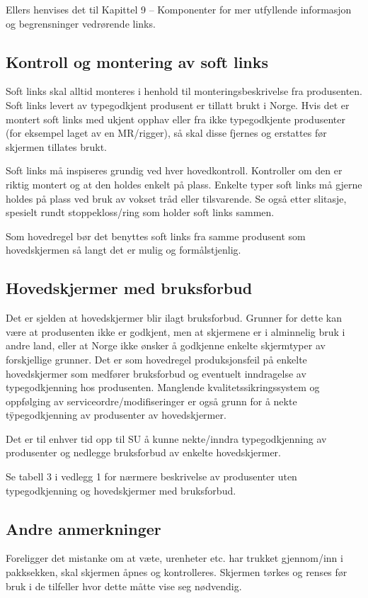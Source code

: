 Ellers henvises det til Kapittel 9 – Komponenter for mer utfyllende informasjon og begrensninger vedrørende links.

\subsection{Kontroll og montering av soft links}
Soft links skal alltid monteres i henhold til monteringsbeskrivelse fra produsenten. Soft links levert av typegodkjent produsent er tillatt brukt i Norge. Hvis det er montert soft links med ukjent opphav eller fra ikke typegodkjente produsenter (for eksempel laget av en MR/rigger), så skal disse fjernes og erstattes før skjermen tillates brukt.

Soft links må inspiseres grundig ved hver hovedkontroll. Kontroller om den er riktig montert og at den holdes enkelt på plass. Enkelte typer soft links må gjerne holdes på plass ved bruk av vokset tråd eller tilsvarende. Se også etter slitasje, spesielt rundt stoppekloss/ring som holder soft links sammen.

Som hovedregel bør det benyttes soft links fra samme produsent som hovedskjermen så langt det er mulig og formålstjenlig.

\subsection{Hovedskjermer med bruksforbud}
Det er sjelden at hovedskjermer blir ilagt bruksforbud. Grunner for dette kan være at produsenten ikke er godkjent, men at skjermene er i alminnelig bruk i andre land, eller at Norge ikke ønsker å godkjenne enkelte skjermtyper av forskjellige grunner. Det er som hovedregel produksjonsfeil på enkelte hovedskjermer som medfører bruksforbud og eventuelt inndragelse av typegodkjenning hos produsenten. Manglende kvalitetssikringssystem og oppfølging av serviceordre/modifiseringer er også grunn for å nekte tÿpegodkjenning av produsenter av hovedskjermer.

Det er til enhver tid opp til SU å kunne nekte/inndra typegodkjenning av produsenter og nedlegge bruksforbud av enkelte hovedskjermer.

Se tabell 3 i vedlegg 1 for nærmere beskrivelse av produsenter uten typegodkjenning og hovedskjermer med bruksforbud.

\subsection{Andre anmerkninger}
Foreligger det mistanke om at væte, urenheter etc. har trukket gjennom/inn i pakksekken, skal skjermen åpnes og kontrolleres. Skjermen tørkes og renses før bruk i de tilfeller hvor dette måtte vise seg nødvendig.

